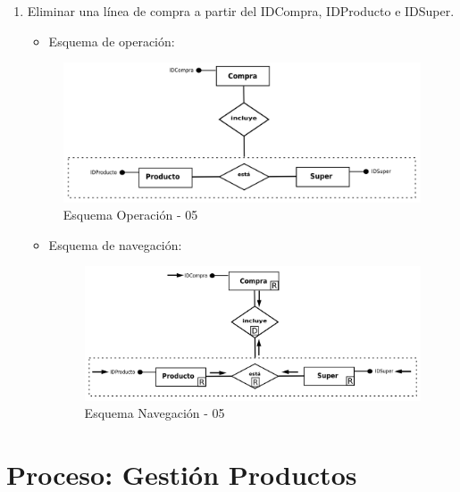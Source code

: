 \documentclass[a4paper,12pt]{report}
\begin{document}
\begin{enumerate}
\item Eliminar una línea de compra a partir del IDCompra, IDProducto e IDSuper.
\begin{itemize}
\item Esquema de operación:
\end{itemize}
\begin{figure}[!htp]
\centering
\includegraphics[width=0.9\linewidth]{./operaciones/img/Compras/05_ope.png}
\caption{Esquema Operación - 05}
\label{fig:ope05}
\medskip
\footnotesize
{}
\end{figure}
\begin{itemize}
\item Esquema de navegación:
\begin{figure}[!htp]
\centering
\includegraphics[width=0.9\linewidth]{./operaciones/img/Compras/05_nav.png}
\caption{Esquema Navegación - 05}
\label{fig:nave05}
\medskip
\footnotesize
{}
\end{figure}
\end{itemize}
\end{enumerate}
\section{Proceso: Gestión Productos}
\label{sec-7-2}
\end{document}
